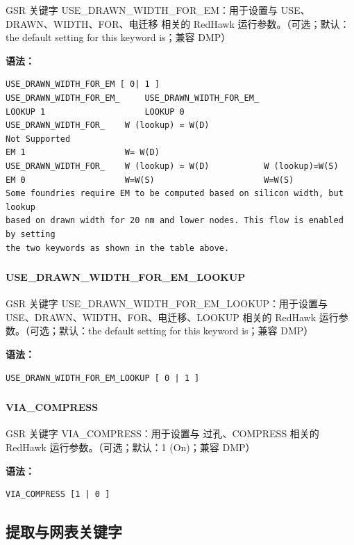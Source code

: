 GSR 关键字 USE_DRAWN_WIDTH_FOR_EM：用于设置与 USE、DRAWN、WIDTH、FOR、电迁移 相关的 RedHawk 运行参数。（可选；默认：the default setting for this keyword is；兼容 DMP）

\textbf{语法：}
\begin{lstlisting}
USE_DRAWN_WIDTH_FOR_EM [ 0| 1 ]
USE_DRAWN_WIDTH_FOR_EM_     USE_DRAWN_WIDTH_FOR_EM_
LOOKUP 1                    LOOKUP 0
USE_DRAWN_WIDTH_FOR_    W (lookup) = W(D)
Not Supported
EM 1                    W= W(D)
USE_DRAWN_WIDTH_FOR_    W (lookup) = W(D)           W (lookup)=W(S)
EM 0                    W=W(S)                      W=W(S)
Some foundries require EM to be computed based on silicon width, but lookup
based on drawn width for 20 nm and lower nodes. This flow is enabled by setting
the two keywords as shown in the table above.
\end{lstlisting}

\subsubsection{}
\paragraph*{USE_DRAWN_WIDTH_FOR_EM_LOOKUP}

GSR 关键字 USE_DRAWN_WIDTH_FOR_EM_LOOKUP：用于设置与 USE、DRAWN、WIDTH、FOR、电迁移、LOOKUP 相关的 RedHawk 运行参数。（可选；默认：the default setting for this keyword is；兼容 DMP）

\textbf{语法：}
\begin{lstlisting}
USE_DRAWN_WIDTH_FOR_EM_LOOKUP [ 0 | 1 ]
\end{lstlisting}

\subsubsection{}
\paragraph*{VIA_COMPRESS}

GSR 关键字 VIA_COMPRESS：用于设置与 过孔、COMPRESS 相关的 RedHawk 运行参数。（可选；默认：1 (On)；兼容 DMP）

\textbf{语法：}
\begin{lstlisting}
VIA_COMPRESS [1 | 0 ]
\end{lstlisting}

\subsection{提取与网表关键字}

